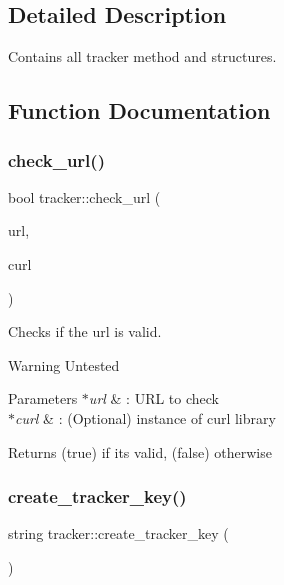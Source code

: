 \subsection{Detailed Description}
Contains all tracker method and structures. 

\subsection{Function Documentation}
\mbox{\label{namespacetracker_a2ceea8b68053534e15cb3ac3fd1702fb}} 
\subsubsection{\texorpdfstring{check\+\_\+url()}{check\_url()}}
{\footnotesize\ttfamily bool tracker\+::check\+\_\+url (\begin{DoxyParamCaption}\item[{const string \&}]{url,  }\item[{C\+U\+RL $\ast$}]{curl }\end{DoxyParamCaption})}



Checks if the url is valid. 

\begin{DoxyWarning}{Warning}
Untested
\end{DoxyWarning}

\begin{DoxyParams}{Parameters}
{\em $\ast$url} & \+: U\+RL to check \\
\hline
{\em $\ast$curl} & \+: (Optional) instance of curl library\\
\hline
\end{DoxyParams}
\begin{DoxyReturn}{Returns}
(true) if it\textquotesingle{}s valid, (false) otherwise 
\end{DoxyReturn}
\mbox{\label{namespacetracker_a722dfd0ec93e84bbbd448d2c9d6a9f1b}} 
\subsubsection{\texorpdfstring{create\+\_\+tracker\+\_\+key()}{create\_tracker\_key()}}
{\footnotesize\ttfamily string tracker\+::create\+\_\+tracker\+\_\+key (\begin{DoxyParamCaption}{ }\end{DoxyParamCaption})}



